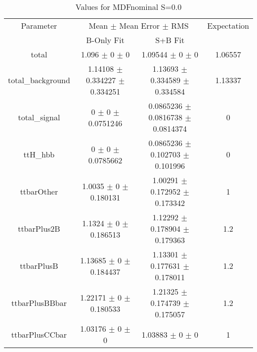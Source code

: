 \begin{table}
\centering
\caption{Values for MDFnominal S=0.0}
\begin{tabular}{cccc}
\toprule
Parameter & \multicolumn{2}{c}{Mean $\pm$ Mean Error $\pm$ RMS} & Expectation\\
 & B-Only Fit & S+B Fit & \\
\midrule
total & \num{1.096} $\pm$ \num{0} $\pm$ \num{0} & \num{1.09544} $\pm$ \num{0} $\pm$ \num{0} & \num{1.06557}\\
total\_background & \num{1.14108} $\pm$ \num{0.334227} $\pm$ \num{0.334251} & \num{1.13693} $\pm$ \num{0.334589} $\pm$ \num{0.334584} & \num{1.13337}\\
total\_signal & \num{0} $\pm$ \num{0} $\pm$ \num{0.0751246} & \num{0.0865236} $\pm$ \num{0.0816738} $\pm$ \num{0.0814374} & \num{0}\\
ttH\_hbb & \num{0} $\pm$ \num{0} $\pm$ \num{0.0785662} & \num{0.0865236} $\pm$ \num{0.102703} $\pm$ \num{0.101996} & \num{0}\\
ttbarOther & \num{1.0035} $\pm$ \num{0} $\pm$ \num{0.180131} & \num{1.00291} $\pm$ \num{0.172952} $\pm$ \num{0.173342} & \num{1}\\
ttbarPlus2B & \num{1.1324} $\pm$ \num{0} $\pm$ \num{0.186513} & \num{1.12292} $\pm$ \num{0.178904} $\pm$ \num{0.179363} & \num{1.2}\\
ttbarPlusB & \num{1.13685} $\pm$ \num{0} $\pm$ \num{0.184437} & \num{1.13301} $\pm$ \num{0.177631} $\pm$ \num{0.178011} & \num{1.2}\\
ttbarPlusBBbar & \num{1.22171} $\pm$ \num{0} $\pm$ \num{0.180533} & \num{1.21325} $\pm$ \num{0.174739} $\pm$ \num{0.175057} & \num{1.2}\\
ttbarPlusCCbar & \num{1.03176} $\pm$ \num{0} $\pm$ \num{0} & \num{1.03883} $\pm$ \num{0} $\pm$ \num{0} & \num{1}\\
\bottomrule
\end{tabular}
\end{table}